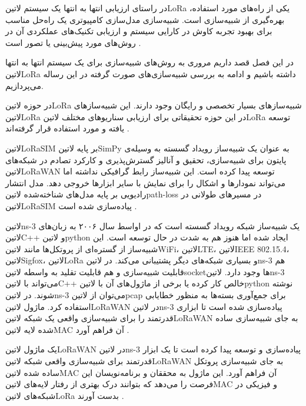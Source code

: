 
در راستای ارزیابی انتها به انتها یک سیستم ‌لاتین{LoRa} یکی از راه‌های مورد استفاده،
بهره‌گیری از شبیه‌سازی است. شبیه‌سازی مدل‌سازی کامپیوتری یک راه‌حل مناسب برای بهبود تجربه
کاوش در کارایی سیستم و ارزیابی تکنیک‌های عملکردی آن در روش‌های مورد پیش‌بینی یا تصور است
.

در این فصل قصد داریم مروری به روش‌های شبیه‌سازی برای یک سیستم انتها به انتها
‌لاتین{LoRa} داشته باشیم و ادامه به بررسی شبیه‌سازی‌های صورت گرفته در این رساله می‌پردازیم.


در حوزه ‌لاتین{LoRa} شبیه‌سازهای بسیار تخصصی و رایگان وجود دارند.
این شبیه‌سازهای ‌لاتین{LoRa} در این حوزه تحقیقاتی برای ارزیابی سناریوهای مختلف ‌لاتین{LoRa}
توسعه یافته و مورد استفاده قرار گرفته‌اند
.


‌لاتین{LoRaSIM} بر پایه ‌لاتین{SimPy} به عنوان یک شبیه‌ساز رویداد گسسته به وسیله‌ی پایتون برای
شبیه‌سازی، تحقیق و آنالیز گسترش‌پذیری و کارکرد تصادم در شبکه‌های ‌لاتین{LoRaWAN} توسعه پیدا کرده است.
این شبیه‌ساز رابط گرافیکی نداشته اما می‌تواند نمودارها و اشکال را برای نمایش با سایر ابزارها خروجی دهد.
مدل انتشار رادیویی بر پایه مدل‌های شناخته‌شده ‌لاتین{path-loss} در مسیرهای طولانی در ‌لاتین{LoRaSIM}
پیاده‌سازی شده است
.


‌لاتین{ns-3} یک شبیه‌ساز شبکه رویداد گسسته است که در اواسط سال ۲۰۰۶
به زبان‌های ‌لاتین{C++} و ‌لاتین{python} ایجاد شده اما هنوز هم به شدت در حال توسعه است.
این شبیه‌ساز از گستره‌ای از پروتکل‌ها مانند ‌لاتین{WiFi}، ‌لاتین{LTE}، ‌لاتین{IEEE 802.15.4}،
‌لاتین{Sigfox}، ‌لاتین{LoRa} و بسیاری شبکه‌های دیگر پشتیبانی می‌کند.
در ‌لاتین{ns-3} هم قابلیت شبیه‌سازی و هم قابلیت تقلید به واسطه ‌لاتین{socket}ها وجود دارد.
‌لاتین{ns-3} می‌تواند با ‌لاتین{C++} خالص کار کرده یا برخی از ماژول‌های آن با ‌لاتین{python}
نوشته شوند.
در ‌لاتین{ns-3} می‌توان از ‌لاتین{pcap} برای جمع‌آوری بسته‌ها به منظور خطایابی استفاده کرد.
ماژول ‌لاتین{LoRaWAN} در ‌لاتین{ns-3} پیاده‌سازی شده است تا ابزاری قدرتمند را برای
شبیه‌سازی واقعی یک شبکه ‌لاتین{LoRaWAN} به جای شبیه‌سازی ساده شده لایه ‌لاتین{MAC} آن
فراهم آورد
.

یک ماژول ‌لاتین{LoRaWAN} در ‌لاتین{ns-3} پیاده‌سازی و توسعه پیدا کرده است تا یک ابزار قدرتمند
برای شبیه‌سازی واقعی شبکه ‌لاتین{LoRaWAN} به جای شبیه‌سازی پروتکل ساده شده ‌لاتین{MAC} آن
فراهم آورد.
این ماژول به محققان و برنامه‌نویسان این فرصت را می‌دهد که بتوانند درک بهتری از رفتار لایه‌های ‌لاتین{MAC}
و فیزیکی در شبکه‌های ‌لاتین{LoRa} بدست آورند
.

